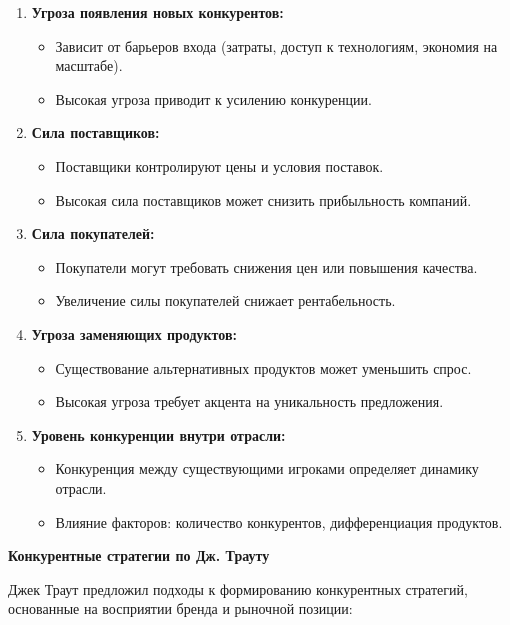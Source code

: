 \begin{enumerate}
    \item \textbf{Угроза появления новых конкурентов:}
    \begin{itemize}
        \item Зависит от барьеров входа (затраты, доступ к технологиям, экономия на масштабе).
        \item Высокая угроза приводит к усилению конкуренции.
    \end{itemize}
    \item \textbf{Сила поставщиков:}
    \begin{itemize}
        \item Поставщики контролируют цены и условия поставок.
        \item Высокая сила поставщиков может снизить прибыльность компаний.
    \end{itemize}
    \item \textbf{Сила покупателей:}
    \begin{itemize}
        \item Покупатели могут требовать снижения цен или повышения качества.
        \item Увеличение силы покупателей снижает рентабельность.
    \end{itemize}
    \item \textbf{Угроза заменяющих продуктов:}
    \begin{itemize}
        \item Существование альтернативных продуктов может уменьшить спрос.
        \item Высокая угроза требует акцента на уникальность предложения.
    \end{itemize}
    \item \textbf{Уровень конкуренции внутри отрасли:}
    \begin{itemize}
        \item Конкуренция между существующими игроками определяет динамику отрасли.
        \item Влияние факторов: количество конкурентов, дифференциация продуктов.
    \end{itemize}
\end{enumerate}

\textbf{Конкурентные стратегии по Дж. Трауту}

Джек Траут предложил подходы к формированию конкурентных стратегий, основанные на восприятии бренда и рыночной позиции:

